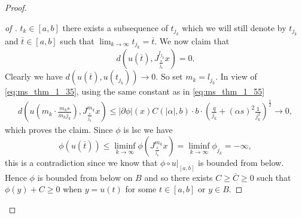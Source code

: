 \documentclass[a4paper,11pt, leqno]{scrreprt} %
\renewcommand{\leq}{\leqslant}
\renewcommand{\leq}{\leqslant}
\renewcommand{\geq}{\geqslant}
\theoremstyle{change}
\theoremstyle{nonumberplain}
\newtheorem{proof}{Proof}
\begin{document}
\begin{proof}
\begin{proof}[of ]
    $t_k \in [a,b]$ there exists a subsequence of $t_{j_k}$ which we
    will still denote by $t_{j_k}$ and $\overline t \in [a,b]$ such
    that $\lim_{k \to \infty} t_{j_k} = \overline t$. We now claim
    that
    \begin{equation}
      \label{eq:ms_thm_1_58}
      d \left ( u(\overline t), J_\frac{s}{j_k}^{l_{j_k}} x \right ) = 0.
    \end{equation}
    Clearly we have $d(u(\overline t), u(t_{j_k})) \to 0$. So set $m_k
    = l_{j_k}$. In view of \eqref{eq:ms_thm_1_35}, using the same
    constant as in \eqref{eq:ms_thm_1_55}
    \begin{equation}
      \label{eq:ms_thm_1_59}
      \begin{split}
        d \left ( u \left (m_k \cdot \frac{m_k s}{m_k j_k} \right ),
          J_{\frac{s}{j_k}}^{m_k} x \right ) \leq |\partial \phi|(x)
        C(|\alpha|, b) \cdot b \cdot \left ( \frac{q}{j_k} + (\alpha
          s)^2 \frac{1}{j_k^2} \right )^{\frac12} \to 0,
      \end{split}
    \end{equation}
    which proves the claim. Since $\phi$ is lsc we have
    \begin{equation}
      \label{eq:ms_thm_1_60}
      \phi(u(\overline t)) \leq \liminf_{k \to \infty} \phi \left (
        J_{\frac{s}{j_k}}^{m_k} x \right ) = \liminf_{k \to \infty}
      \phi_{j_k} = -\infty,
    \end{equation}
    this is a contradiction since we know that $\phi \circ u|_{[a,b]}$
    is bounded from below. Hence $\phi$ is bounded from below on $B$
    and so there exists $C \geq \overline C \geq 0$ such that $\phi(y)
    + C \geq 0$ when $y = u(t)$ for some $t \in [a,b]$ or $y \in B$.


\end{proof}
\end{proof}
\end{document}
